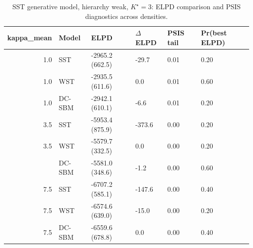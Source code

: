 \begin{table}
\centering
\caption{SST generative model, hierarchy weak, $K^\star=3$: ELPD comparison and PSIS diagnostics across densities.}
\centering
\begin{tabular}[t]{rlllll}
\toprule
kappa_mean & Model & ELPD & $\Delta$ELPD & PSIS tail & Pr(best ELPD)\\
\midrule
1.0 & SST & -2965.2 (662.5) & -29.7 & 0.01 & 0.20\\
1.0 & WST & -2935.5 (611.6) & 0.0 & 0.01 & 0.60\\
1.0 & DC-SBM & -2942.1 (610.1) & -6.6 & 0.01 & 0.20\\
3.5 & SST & -5953.4 (875.9) & -373.6 & 0.00 & 0.20\\
3.5 & WST & -5579.7 (332.5) & 0.0 & 0.00 & 0.20\\
\addlinespace
3.5 & DC-SBM & -5581.0 (348.6) & -1.2 & 0.00 & 0.60\\
7.5 & SST & -6707.2 (585.1) & -147.6 & 0.00 & 0.40\\
7.5 & WST & -6574.6 (639.0) & -15.0 & 0.00 & 0.20\\
7.5 & DC-SBM & -6559.6 (678.8) & 0.0 & 0.00 & 0.40\\
\bottomrule
\end{tabular}
\end{table}
